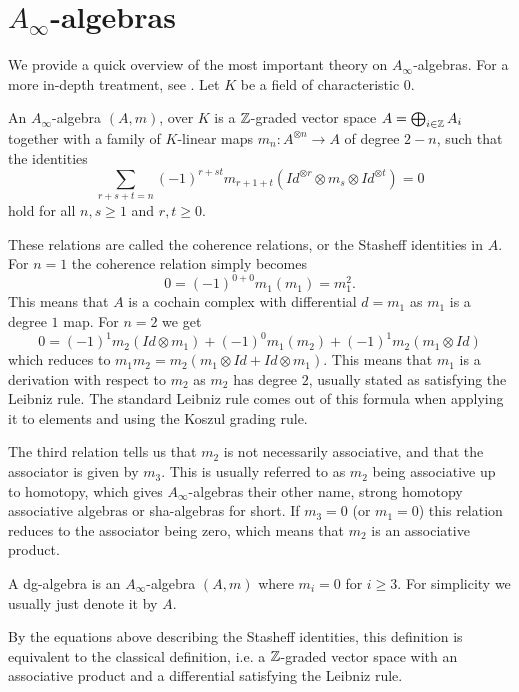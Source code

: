 
\section{\texorpdfstring{$A_\infty$}{A}-algebras}

We provide a quick overview of the most important theory on $A_\infty$-algebras. 
For a more in-depth treatment, see \cite{keller}. 
Let $K$ be a field of characteristic $0$. 

\begin{definition}
    An $A_\infty$-algebra $(A, m)$, over $K$ is a $\mathbb{Z}$-graded vector 
    space $A=\bigoplus_{i\in \mathbb{Z}}A_i$ together with a family of $K$-linear maps 
    $m_n : A^{\otimes n}\longrightarrow A$ of degree $2-n$, such that the identities
    $$\sum_{r+s+t = n}(-1)^{r+st}m_{r+1+t} (Id^{\otimes r}\otimes m_s \otimes Id^{\otimes t}) = 0$$
    hold for all $n, s\geq 1$ and $r, t\geq 0$.
\end{definition}

These relations are called the coherence relations, or the Stasheff identities in $A$. 
For $n=1$ the coherence relation simply becomes $$0 = (-1)^{0+0}m_1 (m_1) = m_1^2 .$$ This 
means that $A$ is a cochain complex with differential $d=m_1$ as $m_1$ is a degree 
$1$ map. For $n=2$ we get
$$0 = (-1)^{1}m_2(Id\otimes m_1)+(-1)^{0}m_1 (m_2)+(-1)^{1}m_2 (m_1\otimes Id)$$
which reduces to $m_1 m_2 = m_2(m_1\otimes Id + Id\otimes m_1)$. This means that $m_1$ is 
a derivation with respect to $m_2$ as $m_2$ has degree $2$, usually stated as satisfying 
the Leibniz rule. The standard Leibniz rule comes out of this formula when applying it to 
elements and using the Koszul grading rule.

The third relation tells us that $m_2$ is not necessarily associative, and that the 
associator is given by $m_3$. This is usually referred to as $m_2$ being associative up 
to homotopy, which gives $A_\infty$-algebras their other name, strong homotopy associative 
algebras or sha-algebras for short. If $m_3=0$ (or $m_1=0$) this relation reduces to the 
associator being zero, which means that $m_2$ is an associative product. 

\begin{definition}
    A dg-algebra is an $A_\infty$-algebra $(A, m)$ where $m_i = 0$ for 
    $i \geq 3$. For simplicity we usually just denote it by $A$. 
\end{definition}

By the equations above describing the Stasheff identities, this definition is equivalent 
to the classical definition, i.e. a $\mathbb{Z}$-graded vector space with an associative product 
and a differential satisfying the Leibniz rule. 

